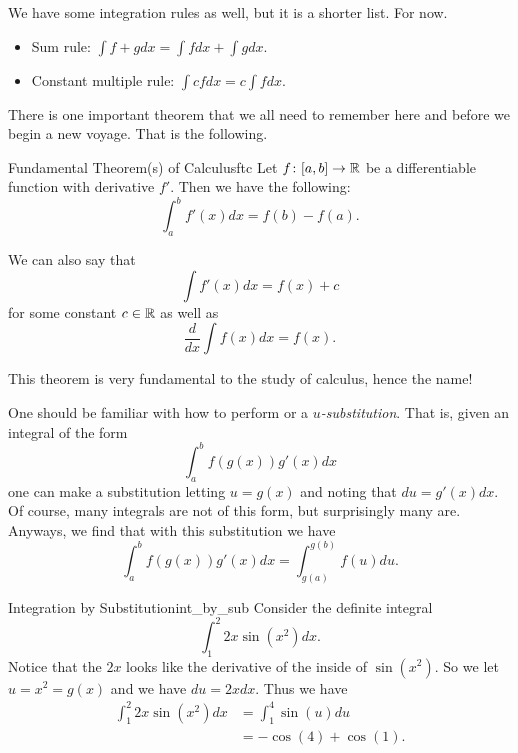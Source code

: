     We have some integration rules as well, but it is a shorter list. For now.
    \begin{itemize}
        \item Sum rule: $\displaystyle{\int f + g dx=\int f dx + \int g dx}$.
        \item Constant multiple rule: $\displaystyle{\int cf dx = c \int f dx}$.
    \end{itemize}
    
    There is one important theorem that we all need to remember here and before we begin a new voyage.  That is the following.
    
    \begin{thm}{Fundamental Theorem(s) of Calculus}{ftc}
    Let $f\colon [a,b] \to \mathbb{R}$ be a differentiable function with derivative $f'$.  Then we have the following:
    \[
    \int_a^b f'(x)dx = f(b)-f(a).
    \]
    
    We can also say that 
    \[
    \int f'(x)dx = f(x)+c
    \]
    for some constant $c\in \mathbb{R}$ as well as
    \[
    \frac{d}{dx} \int f(x)dx = f(x).
    \]
    \end{thm}
    \noindent This theorem is very fundamental to the study of calculus, hence the name!
    
    One should be familiar with how to perform  or a \emph{$u$-substitution}. That is, given an integral of the form
    \[
    \int_a^b f(g(x))g'(x)dx
    \]
    one can make a substitution letting $u=g(x)$ and noting that $du=g'(x)dx$.  Of course, many integrals are not of this form, but surprisingly many are. Anyways, we find that with this substitution we have
    \[
    \int_a^b f(g(x))g'(x)dx= \int_{g(a)}^{g(b)}f(u)du.
    \]
    
    \begin{ex}{Integration by Substitution}{int_by_sub}
        Consider the definite integral
        \[
        \int_1^2 2x\sin\left(x^2\right)dx.
        \]
        Notice that the $2x$ looks like the derivative of the inside of $\sin\left(x^2\right)$.  So we let $u=x^2=g(x)$ and we have $du=2xdx$. Thus we have
        \begin{align*}
            \int_1^2 2x\sin\left( x^2\right)dx &= \int_1^4 \sin(u)du\\
            &= -\cos(4)+\cos(1).
        \end{align*}
    \end{ex}
    
